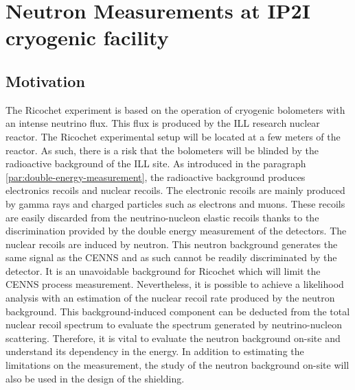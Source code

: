 
\chapter{Neutron Measurements at IP2I cryogenic facility} %

\label{ChapterNeutron} %


%
%
%
%
%
%




\section{Motivation}

The Ricochet experiment is based on the operation of cryogenic bolometers with an intense neutrino flux. This flux is produced by the ILL research nuclear reactor. The Ricochet experimental setup will be located at a few meters of the reactor. As such, there is a risk that the bolometers will be blinded by the radioactive background of the ILL site.
As introduced in the paragraph \ref{par:double-energy-measurement}, the radioactive background produces electronics recoils and nuclear recoils. 
The electronic recoils are mainly produced by gamma rays and charged particles such as electrons and muons. These recoils are easily discarded from the neutrino-nucleon elastic recoils thanks to the discrimination provided by the double energy measurement of the detectors.
The nuclear recoils are induced by neutron. This neutron background generates the same signal as the CENNS and as such cannot be readily discriminated by the detector. It is an unavoidable background for Ricochet which will limit the CENNS process measurement.
Nevertheless, it is possible to achieve a likelihood analysis with an estimation of the nuclear recoil rate produced by the neutron background. This background-induced component can be deducted from the total nuclear recoil spectrum to evaluate the spectrum generated by neutrino-nucleon scattering. 
Therefore, it is vital to evaluate the neutron background on-site and understand its dependency in the energy.
In addition to estimating the limitations on the measurement, the study of the neutron background on-site will also be used in the design of the shielding.

